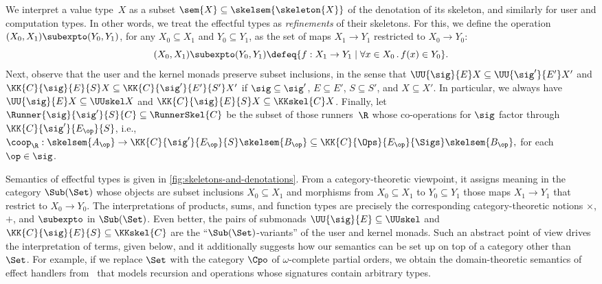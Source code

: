%
%
We interpret a value type~$X$ as a subset
$\sem{X} \subseteq \skelsem{\skeleton{X}}$ of the denotation of its skeleton,
and similarly for user and computation types. In other words, we treat the
effectful types as \emph{refinements} of their skeletons. For this,
we define the operation $(X_0, X_1) \subexpto (Y_0, Y_1)$, for any  
$X_0 \subseteq X_1$ and $Y_0 \subseteq Y_1$, as the set of maps $X_1 \to Y_1$
restricted to $X_0 \to Y_0$: 
%
\begin{equation*}
  (X_0, X_1) \subexpto (Y_0, Y_1) \defeq
  \{ f : X_1 \to Y_1 \mid \forall x \in X_0 \,.\, f(x) \in Y_0 \}.
\end{equation*}
%
Next, observe that the user and the kernel monads preserve subset inclusions, in
the sense that $\UU{\sig}{E} X \subseteq \UU{\sig'}{E'} X'$ and
$\KK{C}{\sig}{E}{S} X \subseteq \KK{C}{\sig'}{E'}{S'} X'$ if
$\sig \subseteq \sig'$, $E \subseteq E'$, $S \subseteq S'$, and
$X \subseteq X'$. In particular, we always have
$\UU{\sig}{E} X \subseteq \UUskel X$ and
$\KK{C}{\sig}{E}{S} X \subseteq \KKskel{C} X$.
%
Finally, let $\Runner{\sig}{\sig'}{S}{C} \subseteq \RunnerSkel{C}$ be the subset of those
runners~$\R$ whose co-operations for $\sig$ factor through $\KK{C}{\sig'}{E_\op}{S}$,
i.e.,
%
$
  \coop_\R : \skelsem{A_\op} \to \KK{C}{\sig'}{E_\op}{S} \skelsem{B_\op}
  \subseteq \KK{C}{\Ops}{E_\op}{\Sigs} \skelsem{B_\op}, 
$
%
for each $\op \in \sig$.

Semantics of effectful types is given in \cref{fig:skeletons-and-denotations}.
%
From a category-theoretic viewpoint, it assigns meaning in the category $\Sub(\Set)$
whose objects are subset inclusions $X_0 \subseteq X_1$ and morphisms from
$X_0 \subseteq X_1$ to $Y_0 \subseteq Y_1$ those maps $X_1 \to Y_1$ that restrict to
$X_0 \to Y_0$. The interpretations of products, sums, and function types are precisely the
corresponding category-theoretic notions $\times$, $+$, and $\subexpto$ in $\Sub(\Set)$.
Even better, the pairs of submonads $\UU{\sig}{E} \subseteq \UUskel$ and
$\KK{C}{\sig}{E}{S} \subseteq \KKskel{C}$ are the ``$\Sub(\Set)$-variants'' of the user
and kernel monads.
%
Such an abstract point of view drives the interpretation of terms, given
below, and it additionally suggests how our semantics can be set up on top of a
category other than~$\Set$. For example, if we replace $\Set$ with the category $\Cpo$ of
$\omega$-complete partial orders, we obtain the domain-theoretic semantics
of effect handlers from~\cite{Bauer:EffectSystem} that models recursion and operations whose
signatures contain arbitrary types.


